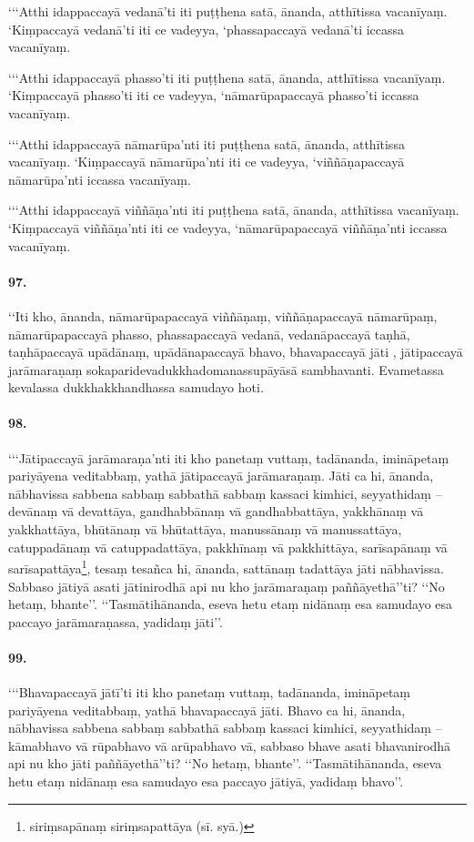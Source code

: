 ‘‘‘Atthi idappaccayā vedanā’ti iti puṭṭhena satā, ānanda, atthītissa vacanīyaṃ. ‘Kiṃpaccayā vedanā’ti iti ce vadeyya, ‘phassapaccayā vedanā’ti iccassa vacanīyaṃ.

‘‘‘Atthi idappaccayā phasso’ti iti puṭṭhena satā, ānanda, atthītissa vacanīyaṃ. ‘Kiṃpaccayā phasso’ti iti ce vadeyya, ‘nāmarūpapaccayā phasso’ti iccassa vacanīyaṃ.

‘‘‘Atthi idappaccayā nāmarūpa’nti iti puṭṭhena satā, ānanda, atthītissa vacanīyaṃ. ‘Kiṃpaccayā nāmarūpa’nti iti ce vadeyya, ‘viññāṇapaccayā nāmarūpa’nti iccassa vacanīyaṃ.

‘‘‘Atthi idappaccayā viññāṇa’nti iti puṭṭhena satā, ānanda, atthītissa vacanīyaṃ. ‘Kiṃpaccayā viññāṇa’nti iti ce vadeyya, ‘nāmarūpapaccayā viññāṇa’nti iccassa vacanīyaṃ.

\paragraph{97.} ‘‘Iti kho, ānanda, nāmarūpapaccayā viññāṇaṃ, viññāṇapaccayā nāmarūpaṃ, nāmarūpapaccayā phasso, phassapaccayā vedanā, vedanāpaccayā taṇhā, taṇhāpaccayā upādānaṃ, upādānapaccayā bhavo, bhavapaccayā jāti , jātipaccayā jarāmaraṇaṃ sokaparidevadukkhadomanassupāyāsā sambhavanti. Evametassa kevalassa dukkhakkhandhassa samudayo hoti.

\paragraph{98.} ‘‘‘Jātipaccayā jarāmaraṇa’nti iti kho panetaṃ vuttaṃ, tadānanda, imināpetaṃ pariyāyena veditabbaṃ, yathā jātipaccayā jarāmaraṇaṃ. Jāti ca hi, ānanda, nābhavissa sabbena sabbaṃ sabbathā sabbaṃ kassaci kimhici, seyyathidaṃ – devānaṃ vā devattāya, gandhabbānaṃ vā gandhabbattāya, yakkhānaṃ vā yakkhattāya, bhūtānaṃ vā bhūtattāya, manussānaṃ vā manussattāya, catuppadānaṃ vā catuppadattāya, pakkhīnaṃ vā pakkhittāya, sarīsapānaṃ vā sarīsapattāya\footnote{siriṃsapānaṃ siriṃsapattāya (sī. syā.)}, tesaṃ tesañca hi, ānanda, sattānaṃ tadattāya jāti nābhavissa. Sabbaso jātiyā asati jātinirodhā api nu kho jarāmaraṇaṃ paññāyethā’’ti? ‘‘No hetaṃ, bhante’’. ‘‘Tasmātihānanda, eseva hetu etaṃ nidānaṃ esa samudayo esa paccayo jarāmaraṇassa, yadidaṃ jāti’’.

\paragraph{99.} ‘‘‘Bhavapaccayā jātī’ti iti kho panetaṃ vuttaṃ, tadānanda, imināpetaṃ pariyāyena veditabbaṃ, yathā bhavapaccayā jāti. Bhavo ca hi, ānanda, nābhavissa sabbena sabbaṃ sabbathā sabbaṃ kassaci kimhici, seyyathidaṃ – kāmabhavo vā rūpabhavo vā arūpabhavo vā, sabbaso bhave asati bhavanirodhā api nu kho jāti paññāyethā’’ti? ‘‘No hetaṃ, bhante’’. ‘‘Tasmātihānanda, eseva hetu etaṃ nidānaṃ esa samudayo esa paccayo jātiyā, yadidaṃ bhavo’’.

